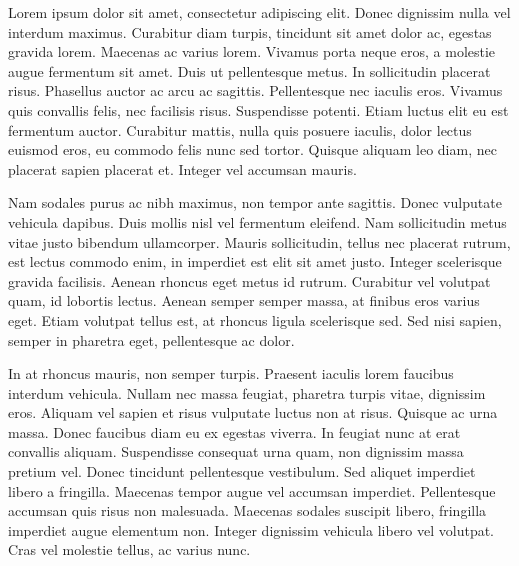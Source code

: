 \begin{resumo}

 Lorem ipsum dolor sit amet, consectetur adipiscing elit. Donec dignissim nulla vel interdum maximus. Curabitur diam turpis, tincidunt sit amet dolor ac, egestas gravida lorem. Maecenas ac varius lorem. Vivamus porta neque eros, a molestie augue fermentum sit amet. Duis ut pellentesque metus. In sollicitudin placerat risus. Phasellus auctor ac arcu ac sagittis. Pellentesque nec iaculis eros. Vivamus quis convallis felis, nec facilisis risus. Suspendisse potenti. Etiam luctus elit eu est fermentum auctor. Curabitur mattis, nulla quis posuere iaculis, dolor lectus euismod eros, eu commodo felis nunc sed tortor. Quisque aliquam leo diam, nec placerat sapien placerat et. Integer vel accumsan mauris.

Nam sodales purus ac nibh maximus, non tempor ante sagittis. Donec vulputate vehicula dapibus. Duis mollis nisl vel fermentum eleifend. Nam sollicitudin metus vitae justo bibendum ullamcorper. Mauris sollicitudin, tellus nec placerat rutrum, est lectus commodo enim, in imperdiet est elit sit amet justo. Integer scelerisque gravida facilisis. Aenean rhoncus eget metus id rutrum. Curabitur vel volutpat quam, id lobortis lectus. Aenean semper semper massa, at finibus eros varius eget. Etiam volutpat tellus est, at rhoncus ligula scelerisque sed. Sed nisi sapien, semper in pharetra eget, pellentesque ac dolor.

In at rhoncus mauris, non semper turpis. Praesent iaculis lorem faucibus interdum vehicula. Nullam nec massa feugiat, pharetra turpis vitae, dignissim eros. Aliquam vel sapien et risus vulputate luctus non at risus. Quisque ac urna massa. Donec faucibus diam eu ex egestas viverra. In feugiat nunc at erat convallis aliquam. Suspendisse consequat urna quam, non dignissim massa pretium vel. Donec tincidunt pellentesque vestibulum. Sed aliquet imperdiet libero a fringilla. Maecenas tempor augue vel accumsan imperdiet. Pellentesque accumsan quis risus non malesuada. Maecenas sodales suscipit libero, fringilla imperdiet augue elementum non. Integer dignissim vehicula libero vel volutpat. Cras vel molestie tellus, ac varius nunc. 



\end{resumo}
